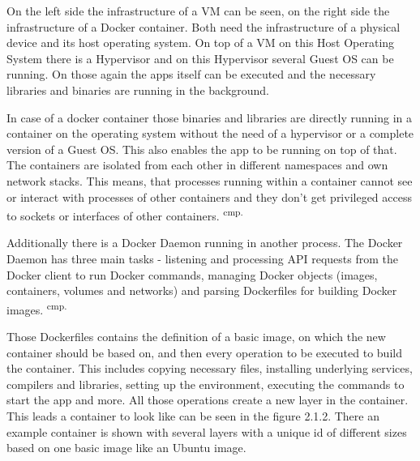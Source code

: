 On the left side the infrastructure of a VM can be seen, on the right side the infrastructure of a Docker container. Both need the infrastructure of a physical device and its host operating system. On top of a VM on this Host Operating System there is a Hypervisor and on this Hypervisor several Guest OS can be running. On those again the apps itself can be executed and the necessary libraries and binaries are running in the background.

In case of a docker container those binaries and libraries are directly running in a container on the operating system without the need of a hypervisor or a complete version of a Guest OS. This also enables the app to be running on top of that. The containers are isolated from each other in different namespaces and own network stacks. This means, that processes running within a container cannot see or interact with processes of other containers and they don't get privileged access to sockets or interfaces of other containers. \textsuperscript{cmp.\cite{14}}


Additionally there is a Docker Daemon running in another process. The Docker Daemon has three main tasks - listening and processing API requests from the Docker client to run Docker commands, managing Docker objects (images, containers, volumes and networks) and parsing Dockerfiles for building Docker images. \textsuperscript{cmp.\cite{15}}


Those Dockerfiles contains the definition of a basic image, on which the new container should be based on, and then every operation to be executed to build the container. This includes copying necessary files, installing underlying services, compilers and libraries, setting up the environment, executing the commands to start the app and more. All those operations create a new layer in the container. This leads a container to look like can be seen in the figure 2.1.2. There an example container is shown with several layers with a unique id of different sizes based on one basic image like an Ubuntu image.


